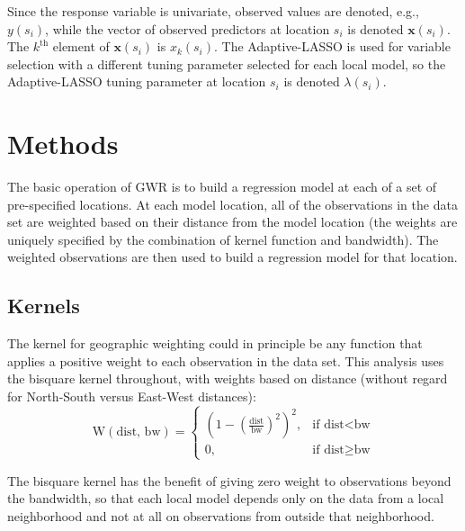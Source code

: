 \documentclass[authoryear ,review]{elsarticle}
\newcommand{\vect}[1]{\boldsymbol{#1}}
\begin{document}
	Since the response variable is univariate, observed values are denoted, e.g., $y(s_i)$, while the vector of observed predictors at location $s_i$ is denoted $\vect{x}(s_i)$. The $k^{\text{th}}$ element of $\vect{x}(s_i)$ is $x_k(s_i)$. The Adaptive-LASSO is used for variable selection with a different tuning parameter selected for each local model, so the Adaptive-LASSO tuning parameter at location $s_i$ is denoted $\lambda(s_i)$.\\ 
	

\section{Methods}
	The basic operation of GWR is to build a regression model at each of a set of pre-specified locations. At each model location, all of the observations in the data set are weighted based on their distance from the model location (the weights are uniquely specified by the combination of kernel function and bandwidth). The weighted observations are then used to build a regression model for that location.\\
	
	\subsection{Kernels}
		The kernel for geographic weighting could in principle be any function that applies a positive weight to each observation in the data set. This analysis uses the bisquare kernel throughout, with weights based on distance (without regard for North-South versus East-West distances):
		\[
			\text{W}(\text{dist, bw}) = \begin{cases} (1-(\frac{\text{dist}}{\text{bw}})^2)^2, & \mbox{if dist} < \mbox{bw} \\
			0, & \mbox{if dist} \ge \mbox{bw} \end{cases}
		\]
		
		The bisquare kernel has the benefit of giving zero weight to observations beyond the bandwidth, so that each local model depends only on the data from a local neighborhood and not at all on observations from outside that neighborhood.\\
		
\end{document}
